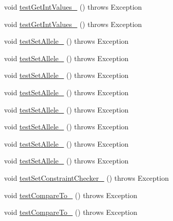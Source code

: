 \begin{DoxyCompactItemize}
\item 
void \hyperlink{classorg_1_1jgap_1_1impl_1_1_fixed_binary_gene_test_a6a70b5a307a971aa5d231f4dcf96dadf}{test\-Get\-Int\-Values\-\_} ()  throws Exception 
\item 
void \hyperlink{classorg_1_1jgap_1_1impl_1_1_fixed_binary_gene_test_abd068bea3d188a94f9734059ebd59537}{test\-Get\-Int\-Values\-\_} ()  throws Exception 
\item 
void \hyperlink{classorg_1_1jgap_1_1impl_1_1_fixed_binary_gene_test_acdd46f2dcfcdfb5802eb30b58795b67c}{test\-Set\-Allele\-\_} ()  throws Exception 
\item 
void \hyperlink{classorg_1_1jgap_1_1impl_1_1_fixed_binary_gene_test_aca7a8311d3cd06bc88b0e43651ed8df5}{test\-Set\-Allele\-\_} ()  throws Exception 
\item 
void \hyperlink{classorg_1_1jgap_1_1impl_1_1_fixed_binary_gene_test_a50dd4d941e2f5a9cde8242932fcea333}{test\-Set\-Allele\-\_} ()  throws Exception 
\item 
void \hyperlink{classorg_1_1jgap_1_1impl_1_1_fixed_binary_gene_test_a70ef875fd5ac00c871b107de0be40ee1}{test\-Set\-Allele\-\_} ()  throws Exception 
\item 
void \hyperlink{classorg_1_1jgap_1_1impl_1_1_fixed_binary_gene_test_a387748bc5c6ba0bb602fc4741df29c21}{test\-Set\-Allele\-\_} ()  throws Exception 
\item 
void \hyperlink{classorg_1_1jgap_1_1impl_1_1_fixed_binary_gene_test_ad96e57b6586edff053bdd6ede3ac9a2f}{test\-Set\-Allele\-\_} ()  throws Exception 
\item 
void \hyperlink{classorg_1_1jgap_1_1impl_1_1_fixed_binary_gene_test_a3117278e20d65961ca43c8ec8d829b5f}{test\-Set\-Allele\-\_} ()  throws Exception 
\item 
void \hyperlink{classorg_1_1jgap_1_1impl_1_1_fixed_binary_gene_test_a0ebe606f70b16e6b9adff8a1d422f56b}{test\-Set\-Allele\-\_} ()  throws Exception 
\item 
void \hyperlink{classorg_1_1jgap_1_1impl_1_1_fixed_binary_gene_test_a28c1c3da974ca8e747cb5b5fd6836ba2}{test\-Set\-Constraint\-Checker\-\_} ()  throws Exception 
\item 
void \hyperlink{classorg_1_1jgap_1_1impl_1_1_fixed_binary_gene_test_a201a69a365f154c6b75f6056ab04834c}{test\-Compare\-To\-\_} ()  throws Exception 
\item 
void \hyperlink{classorg_1_1jgap_1_1impl_1_1_fixed_binary_gene_test_ac7bee112683afb60eb684b47fdbf0b75}{test\-Compare\-To\-\_} ()  throws Exception 
\item 

\end{DoxyCompactItemize}
